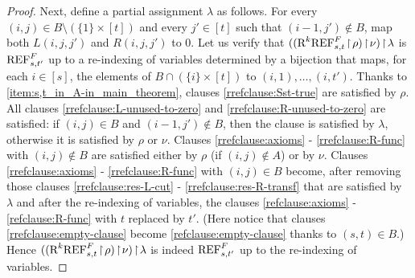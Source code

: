 \begin{proof}
Next, define a partial assignment $\lambda$ as follows. For every $(i,j) \in B \setminus (\{1\} \times [t])$ and every $j' \in [t]$ such that $(i-1,j') \not \in B$, map both $L(i,j,j')$ and $R(i,j,j')$ to 0. 
Let us verify that $((\textnormal{R}^k\textnormal{REF}^{F}_{s,t} \! \restriction \! \rho) \! \restriction \! \nu) \! \restriction \! \lambda$ is $\textnormal{REF}^{F}_{s,t'}$ up to a re-indexing of variables determined by a bijection that maps, for each $i \in [s]$, the elements of $B \cap (\{i\} \times [t])$ to $(i,1),\ldots, (i,t')$. Thanks to \ref{item:s,t_in_A-in_main_theorem}, clauses \eqref{rrefclause:Sst-true} are satisfied by $\rho$. All clauses \eqref{rrefclause:L-unused-to-zero} and \eqref{rrefclause:R-unused-to-zero} are satisfied: if $(i,j) \in B$ and $(i-1,j') \notin B$, then the clause is satisfied by $\lambda$, otherwise it is satisfied by $\rho$ or $\nu$. Clauses \eqref{rrefclause:axioms} - \eqref{rrefclause:R-func} with $(i,j) \notin B$ are satisfied either by $\rho$ (if $(i,j) \notin A$) or by $\nu$. Clauses \eqref{rrefclause:axioms} - \eqref{rrefclause:R-func} with $(i,j) \in B$ become, after removing those clauses \eqref{rrefclause:res-L-cut} - \eqref{rrefclause:res-R-transf} that are satisfied by $\lambda$ and after the re-indexing of variables, the clauses \eqref{refclause:axioms} - \eqref{refclause:R-func} with $t$ replaced by $t'$. (Here notice that clauses \eqref{rrefclause:empty-clause} become \eqref{refclause:empty-clause} thanks to $(s,t) \in B$.) Hence $((\textnormal{R}^k\textnormal{REF}^{F}_{s,t} \! \restriction \! \rho) \! \restriction \! \nu) \! \restriction \! \lambda$ is indeed $\textnormal{REF}^{F}_{s,t'}$ up to the re-indexing of variables. 


\end{proof}

